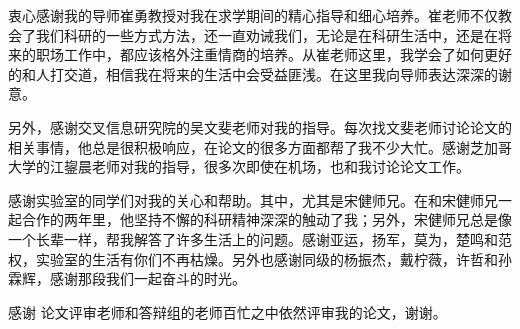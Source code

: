 \begin{acknowledgement}
  衷心感谢我的导师崔勇教授对我在求学期间的精心指导和细心培养。崔老师不仅教会了我们科研的一些方式方法，还一直劝诫我们，无论是在科研生活中，还是在将来的职场工作中，都应该格外注重情商的培养。从崔老师这里，我学会了如何更好的和人打交道，相信我在将来的生活中会受益匪浅。在这里我向导师表达深深的谢意。

  另外，感谢交叉信息研究院的吴文斐老师对我的指导。每次找文斐老师讨论论文的相关事情，他总是很积极响应，在论文的很多方面都帮了我不少大忙。感谢芝加哥大学的江鋆晨老师对我的指导，很多次即使在机场，也和我讨论论文工作。

  感谢实验室的同学们对我的关心和帮助。其中，尤其是宋健师兄。在和宋健师兄一起合作的两年里，他坚持不懈的科研精神深深的触动了我；另外，宋健师兄总是像一个长辈一样，帮我解答了许多生活上的问题。感谢亚运，扬军，莫为，楚鸣和范权，实验室的生活有你们不再枯燥。另外也感谢同级的杨振杰，戴柠薇，许哲和孙霖辉，感谢那段我们一起奋斗的时光。

  感谢 论文评审老师和答辩组的老师百忙之中依然评审我的论文，谢谢。
\end{acknowledgement}
